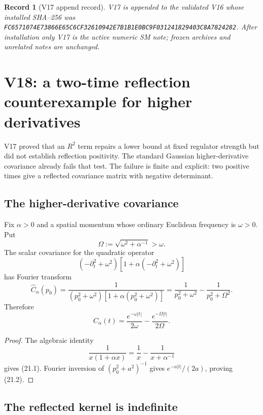 \documentclass[11pt]{article}
\newtheorem{record}[theorem]{Record}
\theoremstyle{remark}
\begin{document}
\begin{record}[V17 append record]
\label{rec:v19v17}
V17 is appended to the validated V16 whose installed SHA--256 was
\texttt{FC6571074E73866E65C6CF32610942E7B1B1E0BC9F031241829403C8A7824282}.
After installation only V17 is the active numeric SM note; frozen archives
and unrelated notes are unchanged.
\end{record}




\section{V18: a two-time reflection counterexample for higher derivatives}
\label{sec:v19v18}

V17 proved that an \(R^2\) term repairs a lower bound at fixed regulator
strength but did not establish reflection positivity.  The standard
Gaussian higher-derivative covariance already fails that test.  The
failure is finite and explicit: two positive times give a reflected
covariance matrix with negative determinant.

\subsection{The higher-derivative covariance}

Fix \(\alpha>0\) and a spatial momentum whose ordinary Euclidean frequency
is \(\omega>0\).  Put
\[
 \Omega:=\sqrt{\omega^2+\alpha^{-1}}>\omega.
\]
The scalar covariance for the quadratic operator
\[
 (-\partial_t^2+\omega^2)
 \left[1+\alpha(-\partial_t^2+\omega^2)\right]
\]
has Fourier transform
\[
 \widehat C_\alpha(p_0)
 =
 \frac1{(p_0^2+\omega^2)
 \left[1+\alpha(p_0^2+\omega^2)\right]}
 =
 \frac1{p_0^2+\omega^2}-\frac1{p_0^2+\Omega^2}.                \tag{21.1}
\]
Therefore
\[
 C_\alpha(t)
 =
 \frac{e^{-\omega|t|}}{2\omega}
 -
 \frac{e^{-\Omega|t|}}{2\Omega}.                              \tag{21.2}
\]

\begin{proof}
The algebraic identity
\[
 \frac1{x(1+\alpha x)}
 =\frac1x-\frac1{x+\alpha^{-1}}
\]
gives (21.1).  Fourier inversion of
\((p_0^2+a^2)^{-1}\) gives \(e^{-a|t|}/(2a)\), proving (21.2).
\end{proof}

\subsection{The reflected kernel is indefinite}
\end{document}
